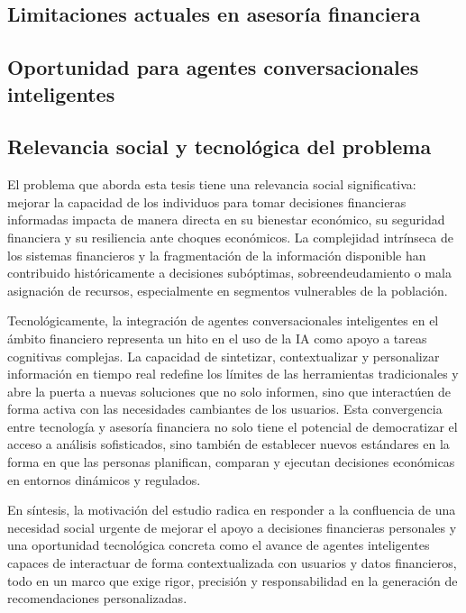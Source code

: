 \documentclass[
	spanish, %
	letterpaper, oneside
]{book}
\begin{document}
\subsection{Limitaciones actuales en asesoría financiera}

\subsection{Oportunidad para agentes conversacionales inteligentes}


\subsection{Relevancia social y tecnológica del problema}

El problema que aborda esta tesis tiene una relevancia social significativa: mejorar la capacidad de los individuos para tomar decisiones financieras informadas impacta de manera directa en su bienestar económico, su seguridad financiera y su resiliencia ante choques económicos. La complejidad intrínseca de los sistemas financieros y la fragmentación de la información disponible han contribuido históricamente a decisiones subóptimas, sobreendeudamiento o mala asignación de recursos, especialmente en segmentos vulnerables de la población.

Tecnológicamente, la integración de agentes conversacionales inteligentes en el ámbito financiero representa un hito en el uso de la IA como apoyo a tareas cognitivas complejas. La capacidad de sintetizar, contextualizar y personalizar información en tiempo real redefine los límites de las herramientas tradicionales y abre la puerta a nuevas soluciones que no solo informen, sino que interactúen de forma activa con las necesidades cambiantes de los usuarios. Esta convergencia entre tecnología y asesoría financiera no solo tiene el potencial de democratizar el acceso a análisis sofisticados, sino también de establecer nuevos estándares en la forma en que las personas planifican, comparan y ejecutan decisiones económicas en entornos dinámicos y regulados.

En síntesis, la motivación del estudio radica en responder a la confluencia de una necesidad social urgente de mejorar el apoyo a decisiones financieras personales y una oportunidad tecnológica concreta como el avance de agentes inteligentes capaces de interactuar de forma contextualizada con usuarios y datos financieros, todo en un marco que exige rigor, precisión y responsabilidad en la generación de recomendaciones personalizadas.
\end{document}
